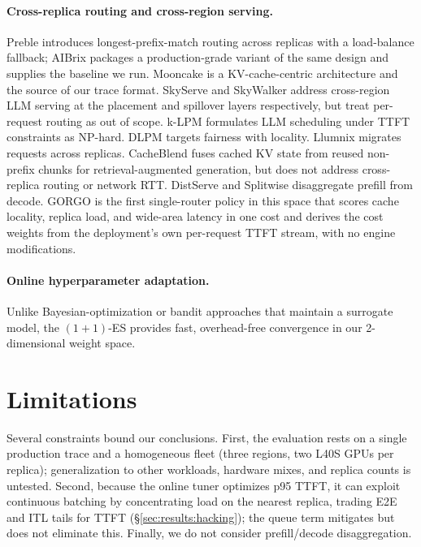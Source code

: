 \documentclass{article}
\begin{document}
\paragraph{Cross-replica routing and cross-region serving.}
Preble \citep{preble} introduces longest-prefix-match routing across replicas
with a load-balance fallback; AIBrix \citep{aibrix2024} packages a
production-grade variant of the same design and supplies the baseline we run.
Mooncake \citep{qin2024mooncake} is a KV-cache-centric architecture and the
source of our trace format. SkyServe \citep{skyserve} and SkyWalker
\citep{skywalker} address cross-region LLM serving at the placement and
spillover layers respectively, but treat per-request routing as out of scope.
k-LPM \citep{klpm2025} formulates LLM scheduling under TTFT constraints as
NP-hard. DLPM \citep{dlpm2025} targets fairness with locality. Llumnix
\citep{llumnix2024} migrates requests across replicas. CacheBlend
\citep{yao2024cacheblend} fuses cached KV state from reused non-prefix chunks
for retrieval-augmented generation, but does not address cross-replica routing
or network RTT. DistServe \citep{distserve2024} and Splitwise
\citep{splitwise2024} disaggregate prefill from decode. GORGO is the first
single-router policy in this space that scores cache locality, replica load,
and wide-area latency in one cost and derives the cost weights from the
deployment's own per-request TTFT stream, with no engine modifications.

\paragraph{Online hyperparameter adaptation.}
Unlike Bayesian-optimization or bandit approaches that maintain a surrogate
model, the $(1{+}1)$-ES \citep{rechenberg1973} provides fast, overhead-free
convergence in our 2-dimensional weight space.

\section{Limitations}
\label{sec:limitations}

Several constraints bound our conclusions. First, the evaluation rests on a
single production trace and a homogeneous fleet (three regions, two L40S GPUs
per replica); generalization to other workloads, hardware mixes, and replica
counts is untested. Second, because the online
tuner optimizes p95 TTFT, it can exploit continuous batching by concentrating
load on the nearest replica, trading E2E and ITL tails for TTFT
(\S\ref{sec:results:hacking}); the queue term mitigates but does not eliminate
this. Finally, we do not consider prefill/decode disaggregation.
\end{document}
